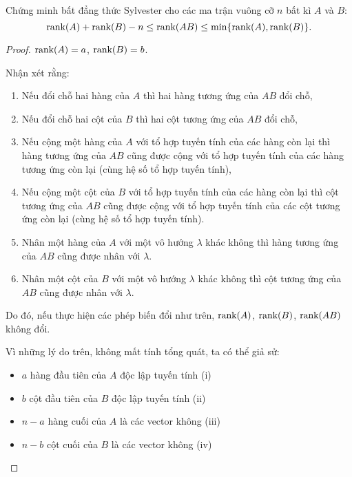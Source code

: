 \documentclass[class=linearalgebra,crop=false]{standalone}
\begin{document}
\begin{exercise}
    \par Chứng minh bất đẳng thức Sylvester cho các ma trận vuông cỡ $n$ bất kì $A$ và $B$:
    \[
        \text{rank}(A) + \text{rank}(B) - n \le \text{rank}(AB) \le \min\{ \text{rank}(A), \text{rank}(B) \}.
    \]
\end{exercise}

\begin{proof}
    \par $\text{rank}(A) = a$, $\text{rank}(B) = b$.
    \par Nhận xét rằng:
    \begin{enumerate}[label = (\roman*)]
        \item Nếu đổi chỗ hai hàng của $A$ thì hai hàng tương ứng của $AB$ đổi chỗ,
        \item Nếu đổi chỗ hai cột của $B$ thì hai cột tương ứng của $AB$ đổi chỗ,
        \item Nếu cộng một hàng của $A$ với tổ hợp tuyến tính của các hàng còn lại thì hàng tương ứng của $AB$ cũng được cộng với tổ hợp tuyến tính của các hàng tương ứng còn lại (cùng hệ số tổ hợp tuyến tính),
        \item Nếu cộng một cột của $B$ với tổ hợp tuyến tính của các hàng còn lại thì cột tương ứng của $AB$ cũng được cộng với tổ hợp tuyến tính của các cột tương ứng còn lại (cùng hệ số tổ hợp tuyến tính).
        \item Nhân một hàng của $A$ với một vô hướng $\lambda$ khác không thì hàng tương ứng của $AB$ cũng được nhân với $\lambda$.
        \item Nhân một cột của $B$ với một vô hướng $\lambda$ khác không thì cột tương ứng của $AB$ cũng được nhân với $\lambda$.
    \end{enumerate}
    \par Do đó, nếu thực hiện các phép biến đổi như trên, $\text{rank}(A)$, $\text{rank}(B)$, $\text{rank}(AB)$ không đổi.
    \bigskip
    \par Vì những lý do trên, không mất tính tổng quát, ta có thể giả sử:
    \begin{itemize}
        \item $a$ hàng đầu tiên của $A$ độc lập tuyến tính (i)
        \item $b$ cột đầu tiên của $B$ độc lập tuyến tính (ii)
        \item $n - a$ hàng cuối của $A$ là các vector không (iii)
        \item $n - b$ cột cuối của $B$ là các vector không (iv)
    \end{itemize}

\end{proof}
\end{document}
